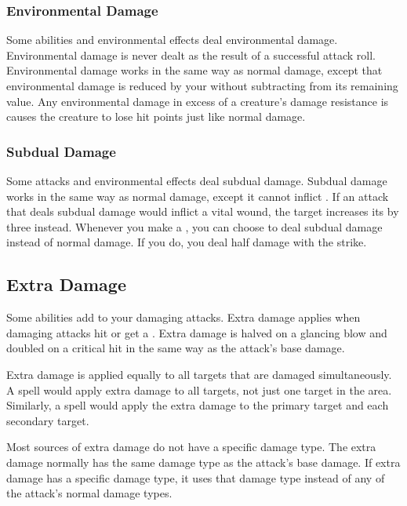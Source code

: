        \subsubsection{Environmental Damage}\label{Environmental Damage}
            Some abilities and environmental effects deal environmental damage.
            Environmental damage is never dealt as the result of a successful attack roll.
            Environmental damage works in the same way as normal damage, except that environmental damage is reduced by your  without subtracting from its remaining value.
            Any environmental damage in excess of a creature's damage resistance is causes the creature to lose hit points just like normal damage.

        \subsubsection{Subdual Damage}\label{Subdual Damage}
            Some attacks and environmental effects deal subdual damage.
            Subdual damage works in the same way as normal damage, except it cannot inflict .
            If an attack that deals subdual damage would inflict a vital wound, the target increases its  by three instead.
            Whenever you make a , you can choose to deal subdual damage instead of normal damage.
            If you do, you deal half damage with the strike.

        \subsection{Extra Damage}\label{Extra Damage}
            Some abilities add  to your damaging attacks.
            Extra damage applies when damaging attacks hit or get a .
            Extra damage is halved on a glancing blow and doubled on a critical hit in the same way as the attack's base damage.

            Extra damage is applied equally to all targets that are damaged simultaneously.
            A  spell would apply extra damage to all targets, not just one target in the area.
            Similarly, a  spell would apply the extra damage to the primary target and each secondary target.

            Most sources of extra damage do not have a specific damage type.
            The extra damage normally has the same damage type as the attack's base damage.
            If extra damage has a specific damage type, it uses that damage type instead of any of the attack's normal damage types.

